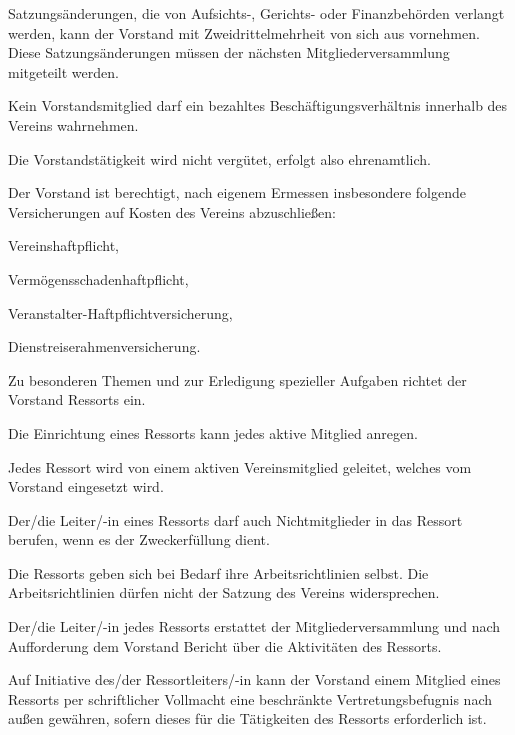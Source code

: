 \documentclass[draft]{scrartcl}
\begin{document}
\begin{contract}
Satzungsänderungen, die von Aufsichts-, Gerichts- oder Finanzbehörden verlangt
werden, kann der Vorstand mit Zweidrittelmehrheit von sich aus vornehmen.
Diese Satzungsänderungen müssen der nächsten Mitgliederversammlung mitgeteilt
werden.


Kein Vorstandsmitglied darf ein bezahltes Beschäftigungsverhältnis innerhalb
des Vereins wahrnehmen.

Die Vorstandstätigkeit wird nicht vergütet, erfolgt also ehrenamtlich.


Der Vorstand ist berechtigt, nach eigenem Ermessen insbesondere folgende
Versicherungen auf Kosten des Vereins abzuschließen:
\begin{compactenum}[\hspace{2em}1.]
  \item Vereinshaftpflicht,
  \item Vermögensschadenhaftpflicht,
  \item Veranstalter-Haftpflichtversicherung,
  \item Dienstreiserahmenversicherung.
\end{compactenum}


Zu besonderen Themen und zur Erledigung spezieller Aufgaben richtet der
Vorstand Ressorts ein.

Die Einrichtung eines Ressorts kann jedes aktive Mitglied anregen.

Jedes Ressort wird von einem aktiven Vereinsmitglied geleitet, welches vom
Vorstand eingesetzt wird.

Der/die Leiter/-in eines Ressorts darf auch Nichtmitglieder in das Ressort
berufen, wenn es der Zweckerfüllung dient.

Die Ressorts geben sich bei Bedarf ihre Arbeitsrichtlinien selbst. Die
Arbeitsrichtlinien dürfen nicht der Satzung des Vereins widersprechen.

Der/die Leiter/-in jedes Ressorts erstattet der Mitgliederversammlung und nach
Auf\/\-for\-derung dem Vorstand Bericht über die Aktivitäten des Ressorts.

Auf Initiative des/der Ressortleiters/-in kann der Vorstand einem Mitglied
eines Ressorts per schriftlicher Vollmacht eine beschränkte
Vertretungsbefugnis nach außen gewähren, sofern dieses für die Tätigkeiten des
Ressorts erforderlich ist.


\end{contract}
\end{document}
